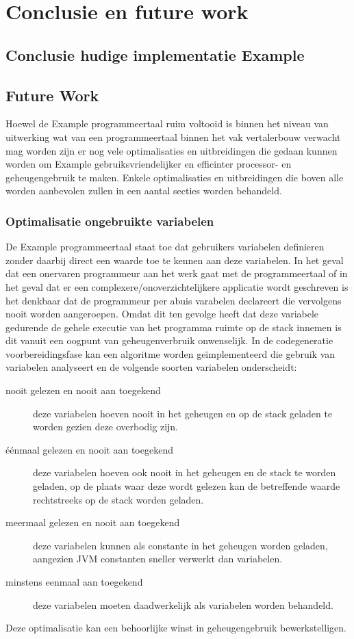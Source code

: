 \chapter{Conclusie en future work}

\section{Conclusie hudige implementatie Example}

\section{Future Work}
Hoewel de Example programmeertaal ruim voltooid is binnen het niveau van uitwerking wat van een programmeertaal binnen het vak vertalerbouw verwacht mag worden zijn er nog vele optimalisaties en uitbreidingen die gedaan kunnen worden om Example gebruiksvriendelijker en efficinter processor- en geheugengebruik te maken. Enkele optimalisaties en uitbreidingen die boven alle worden aanbevolen zullen in een aantal secties worden behandeld.

\subsection{Optimalisatie ongebruikte variabelen}
De Example programmeertaal staat toe dat gebruikers variabelen definieren zonder daarbij direct een waarde toe te kennen aan deze variabelen. In het geval dat een onervaren programmeur aan het werk gaat met de programmeertaal of in het geval dat er een complexere/onoverzichtelijkere applicatie wordt geschreven is het denkbaar dat de programmeur per abuis varabelen declareert die vervolgens nooit worden aangeroepen. Omdat dit ten gevolge heeft dat deze variabele gedurende de gehele executie van het programma ruimte op de stack innemen is dit vanuit een oogpunt van geheugenverbruik onwenselijk. In de codegeneratie voorbereidingsfase kan een algoritme worden ge\"{i}mplementeerd die gebruik van variabelen analyseert en de volgende soorten variabelen onderscheidt:
\begin{description}
\item[nooit gelezen en nooit aan toegekend] deze variabelen hoeven nooit in het geheugen en op de stack geladen te worden gezien deze overbodig zijn.
\item[\'{e}\'{e}nmaal gelezen en nooit aan toegekend] deze variabelen hoeven ook nooit in het geheugen en de stack te worden geladen, op de plaats waar deze wordt gelezen kan de betreffende waarde rechtstreeks op de stack worden geladen.
\item[meermaal gelezen en nooit aan toegekend] deze variabelen kunnen als constante in het geheugen worden geladen, aangezien JVM constanten sneller verwerkt dan variabelen.
\item[minstens eenmaal aan toegekend] deze variabelen moeten daadwerkelijk als variabelen worden behandeld.
\end{description}
Deze optimalisatie kan een behoorlijke winst in geheugengebruik bewerkstelligen.

